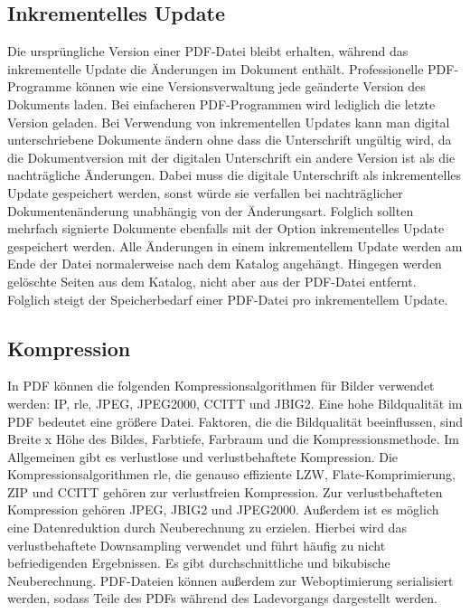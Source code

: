 \subsection{Inkrementelles Update}
Die ursprüngliche Version einer PDF-Datei bleibt erhalten, während das inkrementelle Update die Änderungen im Dokument enthält. Professionelle PDF-Programme können wie eine Versionsverwaltung jede geänderte Version des Dokuments laden. Bei einfacheren PDF-Programmen wird lediglich die letzte Version geladen. Bei Verwendung von inkrementellen Updates kann man digital unterschriebene Dokumente ändern ohne dass die Unterschrift ungültig wird, da die Dokumentversion mit der digitalen Unterschrift ein andere Version ist als die nachträgliche Änderungen. Dabei muss die digitale Unterschrift als inkrementelles Update gespeichert werden, sonst würde sie verfallen bei nachträglicher Dokumentenänderung unabhängig von der Änderungsart. Folglich sollten mehrfach signierte Dokumente ebenfalls mit der Option inkrementelles Update gespeichert werden. \cite{softx} Alle Änderungen in einem inkrementellem Update werden am Ende der Datei normalerweise nach dem Katalog angehängt. Hingegen werden gelöschte Seiten aus dem Katalog, nicht aber aus der PDF-Datei entfernt. Folglich steigt der Speicherbedarf einer PDF-Datei pro inkrementellem Update. \cite{schneeberger} 

\subsection{Kompression}
In PDF können die folgenden Kompressionsalgorithmen für Bilder verwendet werden: IP, \gls{rle}, JPEG, JPEG2000, CCITT und JBIG2. Eine hohe Bildqualität im PDF bedeutet eine größere Datei. Faktoren, die die Bildqualität beeinflussen, sind Breite x Höhe des Bildes, Farbtiefe, Farbraum und die Kompressionsmethode. \cite{softx} Im Allgemeinen gibt es verlustlose und verlustbehaftete Kompression. Die Kompressionsalgorithmen \gls{rle}, die genauso effiziente LZW, Flate-Komprimierung, ZIP und CCITT gehören zur verlustfreien Kompression. Zur verlustbehafteten Kompression gehören JPEG, JBIG2 und JPEG2000. Außerdem ist es möglich eine Datenreduktion durch Neuberechnung zu erzielen. Hierbei wird das verlustbehaftete Downsampling verwendet und führt häufig zu nicht befriedigenden Ergebnissen. Es gibt durchschnittliche und bikubische Neuberechnung. \cite{schneeberger}
PDF-Dateien können außerdem zur Weboptimierung serialisiert werden, sodass Teile des PDFs während des Ladevorgangs dargestellt werden.

